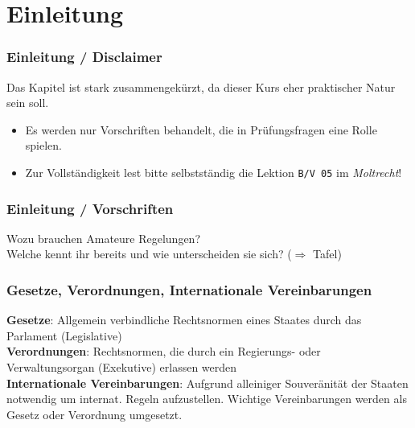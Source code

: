 

\subtitle{Betriebstechnik/Vorschriften 05:  \\
          Gesetze, Vorschriften, Regelungen \\[2em]}
\date{Stand 13.11.2014}



\section{Einleitung}

\begin{frame}
    \frametitle{Einleitung / Disclaimer}

    \begin{center}
        \Large{Das Kapitel ist stark zusammengekürzt, da dieser Kurs eher
        praktischer Natur sein soll.}
    \end{center}

    \normalsize

    \begin{itemize}
        \item Es werden nur Vorschriften behandelt, die in Prüfungsfragen eine Rolle spielen.
        \item Zur Vollständigkeit lest bitte selbstständig die Lektion \texttt{B/V 05} im
        \emph{Moltrecht}!
    \end{itemize}

\end{frame}


\begin{frame}
    \frametitle{Einleitung / Vorschriften}

    \begin{center}
        \Large{Wozu brauchen Amateure Regelungen?} \\
        \Large{Welche kennt ihr bereits und wie unterscheiden sie sich? ($\Rightarrow$ Tafel)}
    \end{center}

\end{frame}

\begin{frame}
    \frametitle{Gesetze, Verordnungen, Internationale Vereinbarungen}

    \textbf{Gesetze}: Allgemein verbindliche Rechtsnormen eines Staates durch
    das Parlament (Legislative) \\[1em]

    \textbf{Verordnungen}: Rechtsnormen, die durch ein Regierungs- oder
    Verwaltungsorgan (Exekutive) erlassen werden \\[1em]

    \textbf{Internationale Vereinbarungen}: Aufgrund alleiniger Souveränität der
    Staaten notwendig um internat. Regeln aufzustellen. Wichtige Vereinbarungen
    werden als Gesetz oder Verordnung umgesetzt.

\end{frame}


